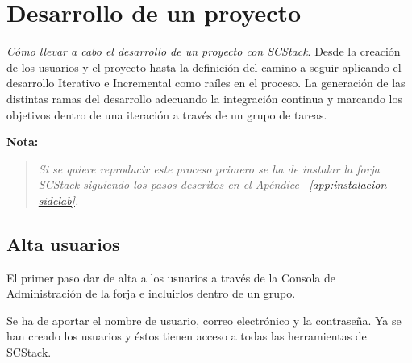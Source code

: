 %
% 

\chapter{Desarrollo de un proyecto}
\label{chap:desarrollo}

\par \emph{Cómo llevar a cabo el desarrollo de un proyecto con SCStack}. Desde la creación de los usuarios y el proyecto hasta la definición del camino a seguir aplicando el desarrollo Iterativo e Incremental como raíles en el proceso. La generación de las distintas ramas del desarrollo adecuando la integración continua y marcando los objetivos dentro de una iteración a través de un grupo de tareas.

\par \textbf{Nota:}

\begin{quote}
    \emph{Si se quiere reproducir este proceso primero se ha de instalar la forja SCStack siguiendo los pasos descritos en el Apéndice ~\ref{app:instalacion-sidelab}.}
\end{quote}

\begin{comment}
Desarrollo en paralelo de un proyecto mediante github + travis-ci vs gerrit + jenkins.
\end{comment}

\section{Alta usuarios}
\label{sec:alta-usuarios}

\par El primer paso dar de alta a los usuarios a través de la Consola de Administración de la forja e incluirlos dentro de un grupo.

\par Se ha de aportar el nombre de usuario, correo electrónico y la contraseña. Ya se han creado los usuarios y éstos tienen acceso a todas las herramientas de SCStack.

